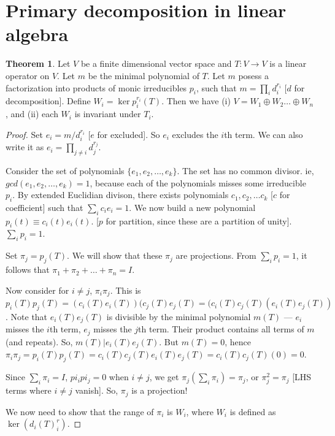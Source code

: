 \documentclass{book}
\newcommand{\osum}{\oplus} %
\theoremstyle{definition}
\newtheorem{theorem}{Theorem}
\begin{document}
\section{Primary decomposition in linear algebra}
\begin{theorem}
Let $V$ be a finite dimensional vector space and $T: V \rightarrow V$
is a linear operator on $V$. Let $m$ be the minimal polynomial of $T$.
Let $m$ posess a factorization into products of monic irreducibles $p_i$,
such that $m = \prod_i d_i^{r_i}$ [$d$ for decomposition].
Define $W_i= \ker p_i^{r_i}(T)$. 
Then we have (i) $V = W_1 \osum W_2 \dots \osum W_n$, and (ii) each $W_i$
is invariant under $T_i$.
\end{theorem}
\begin{proof}
Set $e_i = m / d_i^{r_i}$ [$e$ for excluded]. So $e_i$ excludes the $i$th term.
We can also write it as $e_i = \prod_{j\neq i} d_j^{r_j}$.

Consider the set of polynomials $\{ e_1, e_2, \dots, e_k \}$. The set
has no common divisor. ie, $gcd(e_1, e_2, \dots, e_k) = 1$, because each
of the polynomials misses some irreducible $p_i$.
By extended Euclidian divison, there exists polynomials
$c_1, c_2, \dots c_k$ [$c$ for coefficient] such that $\sum_i c_i e_i = 1$.
We now build a new polynomial $p_i(t) \equiv c_i(t) e_i(t)$. [$p$ for partition, since
these are a partition of unity].
$\sum_i p_i = 1$.

Set $\pi_j = p_j(T)$. We will show that these $\pi_j$ are projections.
From $\sum_i p_i = 1$, it follows that $\pi_1 + \pi_2 + \dots + \pi_n = I$.


Now consider for $i \neq j$, $\pi_i \pi_j$.
This is $p_i(T) p_j(T) = (c_i(T) e_i(T)) (c_j(T) e_j(T) = (c_i(T) c_j(T) (e_i(T) e_j(T))$. Note that
$e_i(T) e_j(T)$ is divisible by the minimal polynomial $m(T)$ --- $e_i$ misses
the $i$th term, $e_j$ misses the $j$th term. Their product contains all
terms of $m$ (and repeats). So, $m(T) | e_i(T) e_j(T)$. But $m(T) = 0$,
hence $\pi_i \pi_j = p_i(T) p_j(T) = c_i(T) c_j(T) e_i(T) e_j(T) = c_i(T) c_j(T) (0) = 0$.

Since $\sum_i \pi_i = I$, $pi_i pi_j = 0$ when $i \neq j$, we get
$\pi_j(\sum_i \pi_i) = \pi_j$, or $\pi_j^2 = \pi_j$ [LHS terms where $i \neq j$ vanish].
So, $\pi_j$ is a projection!


We now need to show that the range of $\pi_i$ is $W_i$, where $W_i$
is defined as $\ker (d_i(T)^r_i)$.


\end{proof}
\end{document}
